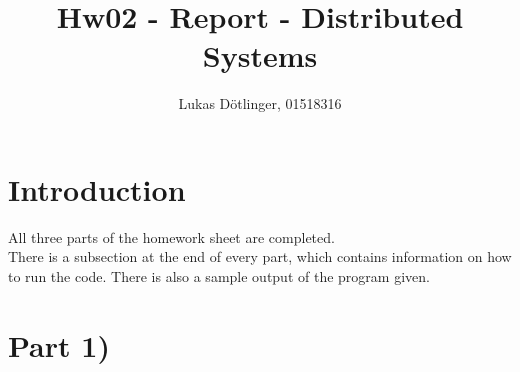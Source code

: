 \documentclass{article}
\begin{document}
  \title{Hw02 - Report - Distributed Systems}
  \date{}
  \author{Lukas Dötlinger, 01518316}
	
  \maketitle
  
  \section*{Introduction}
    
    All three parts of the homework sheet are completed.\\
    There is a subsection at the end of every part, which contains information on how to run the code. There is also a sample output of the program given.\\
	
  \section*{Part 1)}
	
\end{document}
